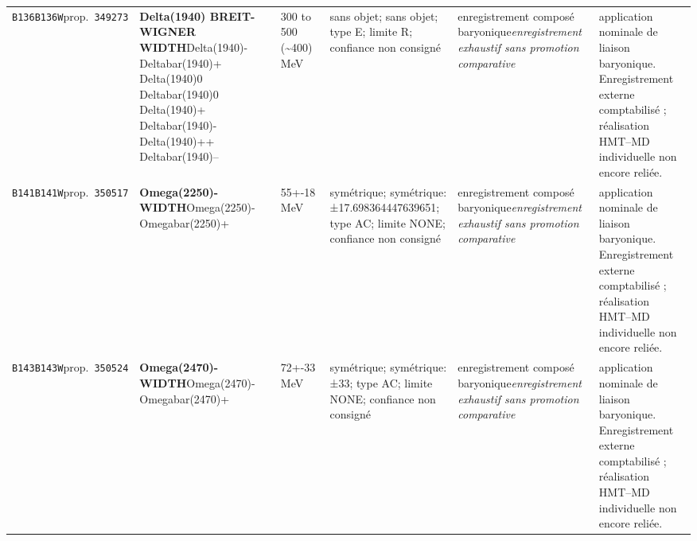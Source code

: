 \begin{landscape}
\begin{longtable}{L{1.85cm}L{4.45cm}L{2.35cm}L{4.05cm}L{3.35cm}L{7.15cm}}
\texttt{B136}\newline \texttt{B136W}\newline prop.\ \texttt{349273} & \textbf{Delta(1940) BREIT-WIGNER WIDTH}\newline Delta(1940)- \textbar{}\allowbreak{} Deltabar(1940)+ \textbar{}\allowbreak{} Delta(1940)0 \textbar{}\allowbreak{} Deltabar(1940)0 \textbar{}\allowbreak{} Delta(1940)+ \textbar{}\allowbreak{} Deltabar(1940)- \textbar{}\allowbreak{} Delta(1940)++ \textbar{}\allowbreak{} Deltabar(1940)-- & 300 to 500 (\textasciitilde{}400)\,MeV & sans objet; sans objet; type E; limite R; confiance non consigné & enregistrement composé baryonique\newline \emph{enregistrement exhaustif sans promotion comparative} & application nominale de liaison baryonique. Enregistrement externe comptabilisé ; réalisation HMT--MD individuelle non encore reliée. \\
\texttt{B141}\newline \texttt{B141W}\newline prop.\ \texttt{350517} & \textbf{Omega(2250)- WIDTH}\newline Omega(2250)- \textbar{}\allowbreak{} Omegabar(2250)+ & 55+-18\,MeV & symétrique; symétrique: ±17.698364447639651; type AC; limite NONE; confiance non consigné & enregistrement composé baryonique\newline \emph{enregistrement exhaustif sans promotion comparative} & application nominale de liaison baryonique. Enregistrement externe comptabilisé ; réalisation HMT--MD individuelle non encore reliée. \\
\texttt{B143}\newline \texttt{B143W}\newline prop.\ \texttt{350524} & \textbf{Omega(2470)- WIDTH}\newline Omega(2470)- \textbar{}\allowbreak{} Omegabar(2470)+ & 72+-33\,MeV & symétrique; symétrique: ±33; type AC; limite NONE; confiance non consigné & enregistrement composé baryonique\newline \emph{enregistrement exhaustif sans promotion comparative} & application nominale de liaison baryonique. Enregistrement externe comptabilisé ; réalisation HMT--MD individuelle non encore reliée. \\

\end{longtable}
\end{landscape}
